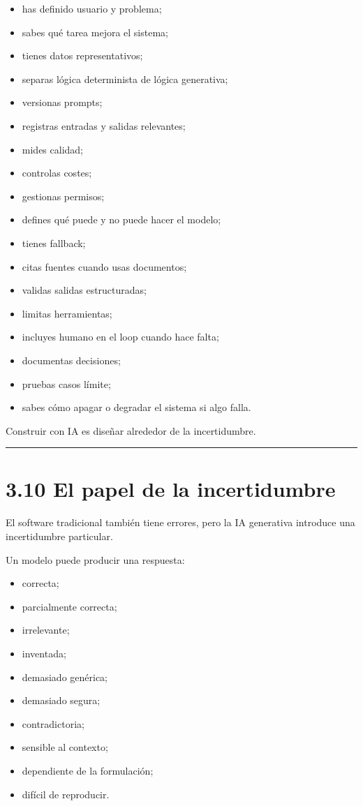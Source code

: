\begin{itemize}
\tightlist
\item
  has definido usuario y problema;
\item
  sabes qué tarea mejora el sistema;
\item
  tienes datos representativos;
\item
  separas lógica determinista de lógica generativa;
\item
  versionas prompts;
\item
  registras entradas y salidas relevantes;
\item
  mides calidad;
\item
  controlas costes;
\item
  gestionas permisos;
\item
  defines qué puede y no puede hacer el modelo;
\item
  tienes fallback;
\item
  citas fuentes cuando usas documentos;
\item
  validas salidas estructuradas;
\item
  limitas herramientas;
\item
  incluyes humano en el loop cuando hace falta;
\item
  documentas decisiones;
\item
  pruebas casos límite;
\item
  sabes cómo apagar o degradar el sistema si algo falla.
\end{itemize}

Construir con IA es diseñar alrededor de la incertidumbre.

\begin{center}\rule{0.5\linewidth}{0.5pt}\end{center}

\section{3.10 El papel de la
incertidumbre}\label{el-papel-de-la-incertidumbre}

El software tradicional también tiene errores, pero la IA generativa
introduce una incertidumbre particular.

Un modelo puede producir una respuesta:

\begin{itemize}
\tightlist
\item
  correcta;
\item
  parcialmente correcta;
\item
  irrelevante;
\item
  inventada;
\item
  demasiado genérica;
\item
  demasiado segura;
\item
  contradictoria;
\item
  sensible al contexto;
\item
  dependiente de la formulación;
\item
  difícil de reproducir.
\end{itemize}


